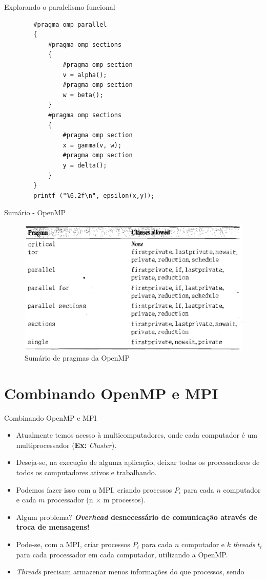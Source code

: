 \begin{frame}[fragile]{Explorando o paralelismo funcional}
	\begin{verbatim}
		#pragma omp parallel
		{
			#pragma omp sections
			{
				#pragma omp section
				v = alpha();
				#pragma omp section
				w = beta();
			}
			#pragma omp sections
			{
				#pragma omp section
				x = gamma(v, w);
				#pragma omp section
				y = delta();
			}
		}
		printf ("%6.2f\n", epsilon(x,y));
	\end{verbatim}
\end{frame}

\begin{frame}{Sumário - OpenMP}
	\begin{figure}
		\centering
		\includegraphics[width=0.8\linewidth]{img/quinn/sum-omp}
		\caption[Sumário de pragmas da OpenMP]{Sumário de pragmas da OpenMP}
		\label{fig:sum-omp}
	\end{figure}
\end{frame}

\section{Combinando OpenMP e MPI}

\begin{frame}{Combinando OpenMP e MPI}
	\begin{itemize}
		\item Atualmente temos acesso à multicomputadores, onde cada computador é um multiprocessador (\textbf{Ex:} \textit{Cluster}).
		\medskip
		\item Deseja-se, na execução de alguma aplicação, deixar todas os processadores de todos os computadores ativos e trabalhando.
		\medskip
		\item Podemos fazer isso com a MPI, criando processos $P_i$ para cada $n$ computador e cada $m$ processador (n $\times$ m processos).
		\medskip
		\item  Algum problema? \pause \textbf{{\color{bostonuniversityred} \textit{Overhead} desnecessário de comunicação através de troca de mensagens!}}
		\pause
		\medskip
		\item Pode-se, com a MPI, criar processos $P_i$ para cada $n$ computador e $k$ \textit{threads} $t_i$ para cada processador em cada computador, utilizando a OpenMP.
		\medskip
		\item \textit{Threads} precisam armazenar menos informações do que processos, sendo 
	\end{itemize}
\end{frame}

